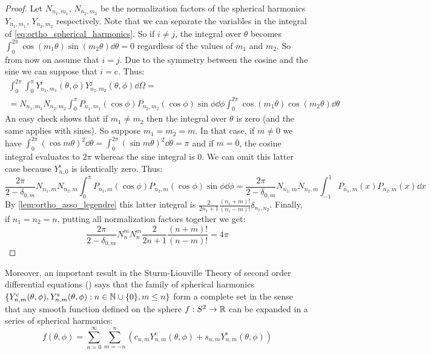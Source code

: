 \documentclass[../main.tex]{subfiles}
\begin{document}
\begin{proof}
  Let $N_{n_1,m_1}$, $N_{n_2,m_2}$ be the normalization factors of the spherical harmonics $Y_{n_1,m_1}$, $Y_{n_2,m_2}$ respectively. Note that we can separate the variables in the integral of \cref{eq:ortho_spherical_harmonics}. So if $i\ne j$, the integral over $\theta$ becomes $\int_0^{2\pi}\cos(m_1\theta)\sin(m_2\theta)\dd{\theta}=0$ regardless of the values of $m_1$ and $m_2$. So from now on assume that $i=j$. Due to the symmetry between the cosine and the sine we can suppose that $i=\mathrm{c}$. Thus:
  \begin{multline}
    \int_0^{2\pi}\int_0^\pi Y_{n_1,m_1}^i(\theta,\phi) Y_{n_2,m_2}^j(\theta,\phi)\dd\Omega=\\= N_{n_1,m_1}N_{n_2,m_2}\int_0^\pi P_{n_1,m_1}(\cos\phi) P_{n_2,m_2}(\cos\phi)\sin\phi\dd\phi\int_{0}^{2\pi}\cos(m_1\theta)\cos(m_2\theta)\dd{\theta}
  \end{multline}
  An easy check shows that if $m_1\neq m_2$ then the integral over $\theta$ is zero (and the same applies with sines). So suppose $m_1=m_2=m$. In that case, if $m\ne 0$ we have $\int_{0}^{2\pi}{(\cos m\theta)}^2\dd{\theta}=\int_{0}^{2\pi}{(\sin m\theta)}^2\dd{\theta}=\pi$ and if $m=0$, the cosine integral evaluates to $2\pi$ whereas the sine integral is 0. We can omit this latter case because $Y_{n,0}^{\mathrm{s}}$ is identically zero. Thus:
  \begin{equation}
    \frac{2\pi}{2-\delta_{0,m}} N_{n_1,m}N_{n_2,m}\int_0^\pi P_{n_1,m}(\cos\phi) P_{n_2,m}(\cos\phi)\sin\phi\dd\phi=\frac{2\pi}{2-\delta_{0,m}} N_{n_1,m}N_{n_2,m}\int_{-1}^1 P_{n_1,m}(x) P_{n_2,m}(x)\dd{x}
  \end{equation}
  By \cref{lem:ortho_asso_legendre} this latter integral is $\frac{2}{2n_1+1}\frac{(n_1+m)!}{(n_1-m)!} \delta_{n_1,n_2}$. Finally, if $n_1=n_2=n$, putting all normalization factors together we get:
  \begin{equation}
    \frac{2\pi}{2-\delta_{0,m}} N_{n}^{m}N_{n}^{m}\frac{2}{2n+1}\frac{(n+m)!}{(n-m)!}=4\pi
  \end{equation}
\end{proof}
Moreover, an important result in the Sturm-Liouville Theory of second order differential equations (\cite{wiki:sturmliouville,completenessSL}) says that the family of spherical harmonics $\{Y_{n,m}^{\mathrm{c}}(\theta,\phi),Y_{n,m}^{\mathrm{s}}(\theta,\phi):n\in\mathbb{N}\cup\{0\},m\leq n\}$ form a complete set in the sense that any smooth function defined on the sphere $f:S^2\rightarrow\mathbb{R}$ can be expanded in a series of spherical harmonics:
\begin{equation}
  f(\theta,\phi)=\sum_{n=0}^\infty\sum_{m=-n}^n (c_{n,m} Y_{n,m}^{\mathrm{c}}(\theta,\phi)+s_{n,m} Y_{n,m}^{\mathrm{s}}(\theta,\phi))
\end{equation}
\end{document}
